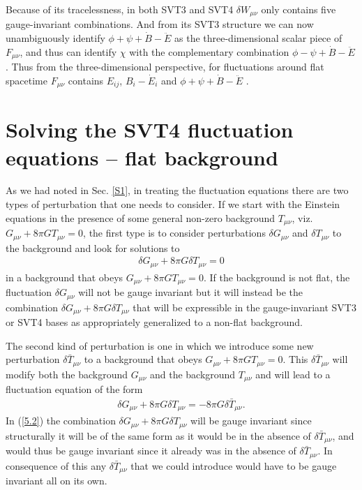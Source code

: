 \documentclass[aps,onecolumn,10pt]{revtex4}
\numberwithin{equation}{section}
\numberwithin{equation}{section}
\begin{document}
Because of its tracelessness, in both SVT3 and SVT4 $\delta W_{\mu\nu}$ only contains five gauge-invariant combinations. And from its SVT3 structure we can now unambiguously identify $\phi + \psi +\dot{B}-\ddot{E}$ as the three-dimensional scalar piece of $F_{\mu\nu}$, and thus can identify $\chi$ with the complementary combination $\phi - \psi +\dot{B}-\ddot{E}$. Thus from the three-dimensional perspective, for fluctuations around flat spacetime $F_{\mu\nu}$ contains $E_{ij}$, $B_i-\dot{E}_i$ and $\phi + \psi +\dot{B}-\ddot{E}$ \cite{footnote7}. 

\section{Solving the SVT4 fluctuation equations -- flat background}
\label{S5}

As we had noted in Sec. \ref{S1}, in treating the fluctuation equations there are two types of perturbation that one needs to consider. If we start with the Einstein equations in the presence of some general non-zero background $T_{\mu\nu}$, viz. $G_{\mu\nu}+8\pi G T_{\mu\nu}=0$, the first type is to consider perturbations $\delta G_{\mu\nu}$ and $\delta T_{\mu\nu}$ to the background and look for solutions to  
%
\begin{eqnarray}
\delta G_{\mu\nu}+8\pi G \delta T_{\mu\nu}=0
\label{5.1}
\end{eqnarray}
%
in a background that obeys $G_{\mu\nu}+8\pi G T_{\mu\nu}=0$. If the background is not flat, the fluctuation $\delta G_{\mu\nu}$ will not be gauge invariant  but it will instead be the combination $\delta G_{\mu\nu}+8\pi G \delta T_{\mu\nu}$  that will be expressible in the gauge-invariant SVT3 or SVT4 bases as appropriately generalized to a non-flat background.

The second kind of perturbation is one in which we introduce some new perturbation $\delta \bar{T}_{\mu\nu}$ to a background that obeys $G_{\mu\nu}+8\pi G T_{\mu\nu}=0$. This $\delta \bar{T}_{\mu\nu}$ will modify both the background $G_{\mu\nu}$ and the background $T_{\mu\nu}$ and will lead to a fluctuation equation of the form 
%
\begin{eqnarray}
\delta G_{\mu\nu}+8\pi G \delta T_{\mu\nu}=-8 \pi G \delta \bar{T}_{\mu\nu}. 
\label{5.2}
\end{eqnarray}
%
In (\ref{5.2}) the combination $\delta G_{\mu\nu}+8\pi G \delta T_{\mu\nu}$ will be gauge invariant since structurally it will be of the same form as it would be in the absence of $\delta \bar{T}_{\mu\nu}$, and would thus be gauge invariant since it already was in the absence of $\delta \bar{T}_{\mu\nu}$. In consequence of this any $\delta \bar{T}_{\mu\nu}$ that we could introduce would have to be gauge invariant all on its own.
\end{document}
